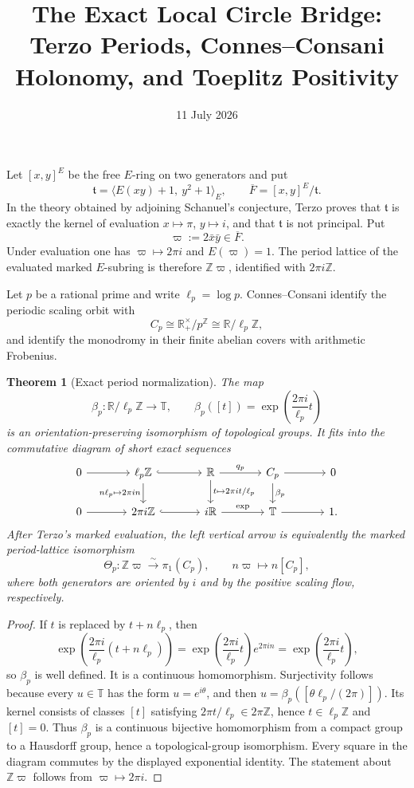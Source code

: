 \documentclass[11pt]{article}
\title{The Exact Local Circle Bridge: Terzo Periods, Connes--Consani Holonomy, and Toeplitz Positivity}
\author{}
\date{11 July 2026}
\newtheorem{theorem}[definition]{Theorem}
\newcommand{\R}{\mathbb R}
\newcommand{\Z}{\mathbb Z}
\newcommand{\T}{\mathbb T}
\begin{document}
\maketitle

Let $[x,y]^E$ be the free $E$-ring on two generators and put
\[
 \mathfrak t=\langle E(xy)+1,\ y^2+1\rangle_E,
 \qquad \overline F=[x,y]^E/\mathfrak t.
\]
In the theory obtained by adjoining Schanuel's conjecture, Terzo proves that $\mathfrak t$ is exactly the kernel of evaluation $x\mapsto\pi$, $y\mapsto i$, and that $\mathfrak t$ is not principal.  Put
\[
 \varpi:=2\bar x\bar y\in\overline F.
\]
Under evaluation one has $\varpi\mapsto2\pi i$ and $E(\varpi)=1$.  The period lattice of the evaluated marked $E$-subring is therefore $\Z\varpi$, identified with $2\pi i\Z$.

Let $p$ be a rational prime and write $\ell_p=\log p$.  Connes--Consani identify the periodic scaling orbit with
\[
 C_p\cong \R_+^\times/p^\Z\cong \R/\ell_p\Z,
\]
and identify the monodromy in their finite abelian covers with arithmetic Frobenius.

\begin{theorem}[Exact period normalization]
The map
\[
 \beta_p:\R/\ell_p\Z\longrightarrow\T,
 \qquad
 \beta_p([t])=\exp\!\left(\frac{2\pi i}{\ell_p}t\right)
\]
is an orientation-preserving isomorphism of topological groups.  It fits into the commutative diagram of short exact sequences
\[
\begin{tikzcd}[column sep=large]
0 \arrow[r] & \ell_p\Z \arrow[r,hook] \arrow[d,"n\ell_p\mapsto2\pi in"'] &
\R \arrow[r,"q_p"] \arrow[d,"t\mapsto 2\pi it/\ell_p"] &
C_p \arrow[r] \arrow[d,"\beta_p"] & 0\\
0 \arrow[r] & 2\pi i\Z \arrow[r,hook] &
 i\R \arrow[r,"\exp"] & \T \arrow[r] & 1.
\end{tikzcd}
\]
After Terzo's marked evaluation, the left vertical arrow is equivalently the marked period-lattice isomorphism
\[
 \Theta_p:\Z\varpi\xrightarrow{\sim}\pi_1(C_p),
 \qquad
 n\varpi\longmapsto n[C_p],
\]
where both generators are oriented by $i$ and by the positive scaling flow, respectively.
\end{theorem}

\begin{proof}
If $t$ is replaced by $t+n\ell_p$, then
\[
 \exp\!\left(\frac{2\pi i}{\ell_p}(t+n\ell_p)\right)
 =\exp\!\left(\frac{2\pi i}{\ell_p}t\right)e^{2\pi in}
 =\exp\!\left(\frac{2\pi i}{\ell_p}t\right),
\]
so $\beta_p$ is well defined.  It is a continuous homomorphism.  Surjectivity follows because every $u\in\T$ has the form $u=e^{i\theta}$, and then $u=\beta_p([\theta\ell_p/(2\pi)])$.  Its kernel consists of classes $[t]$ satisfying $2\pi t/\ell_p\in2\pi\Z$, hence $t\in\ell_p\Z$ and $[t]=0$.  Thus $\beta_p$ is a continuous bijective homomorphism from a compact group to a Hausdorff group, hence a topological-group isomorphism.  Every square in the diagram commutes by the displayed exponential identity.  The statement about $\Z\varpi$ follows from $\varpi\mapsto2\pi i$.
\end{proof}
\end{document}
